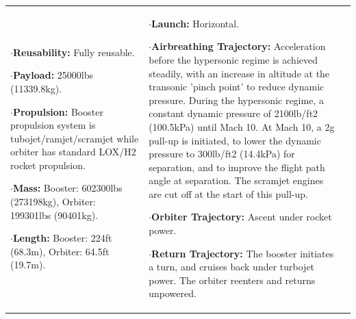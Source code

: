 {\begin{landscape}
\begin{xltabular}{\linewidth}{|X|X|X|}
	$\cdot$\textbf{Reusability:} Fully reusable.
	
	$\cdot$\textbf{Payload:} 25000lbs (11339.8kg).
	
	$\cdot$\textbf{Propulsion:} Booster propulsion system is tubojet/ramjet/scramjet while orbiter has standard LOX/H2 rocket propulsion. 
	
	$\cdot$\textbf{Mass:} Booster: 602300lbs (273198kg), Orbiter: 199301lbs (90401kg).
	
	$\cdot$\textbf{Length:} Booster: 224ft (68.3m), Orbiter: 64.5ft (19.7m).
	&\small
	
	$\cdot$\textbf{Launch:} Horizontal.
	
	$\cdot$\textbf{Airbreathing Trajectory:} Acceleration before the hypersonic regime is achieved steadily, with an increase in altitude at the transonic 'pinch point' to reduce dynamic pressure. 
	During the hypersonic regime, a constant dynamic pressure of 2100lb/ft2 (100.5kPa) until Mach 10.
	At Mach 10, a 2g pull-up is initiated, to lower the dynamic pressure to 300lb/ft2 (14.4kPa) for separation, and to improve the flight path angle at separation. The scramjet engines are cut off at the start of this pull-up.  
	
	$\cdot$\textbf{Orbiter Trajectory:} Ascent under rocket power. 
	
	$\cdot$\textbf{Return Trajectory:} The booster initiates a turn, and cruises back under turbojet power. 
	The orbiter reenters and returns unpowered. 
	

\end{xltabular}
\end{landscape}}

